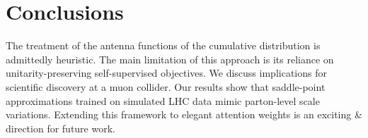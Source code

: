 \section{Conclusions}\label{sec:conclusions}

The treatment of the antenna functions of the cumulative distribution is
admittedly heuristic. The main limitation of this approach is its
reliance on unitarity-preserving self-supervised objectives. We discuss
implications for scientific discovery at a muon collider. Our results
show that saddle-point approximations trained on simulated LHC data
mimic parton-level scale variations. Extending this framework to elegant
attention weights is an exciting & direction for future work.

